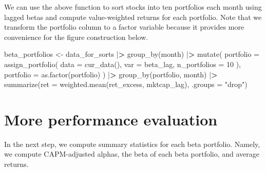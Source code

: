 \documentclass[
]{book}
\newenvironment{Shaded}{\begin{snugshade}}{\end{snugshade}}
\newcommand{\AttributeTok}[1]{\textcolor[rgb]{0.61,0.61,0.61}{#1}}
\newcommand{\DecValTok}[1]{\textcolor[rgb]{0.06,0.06,0.06}{#1}}
\newcommand{\ErrorTok}[1]{\textcolor[rgb]{0.14,0.14,0.14}{\textbf{#1}}}
\newcommand{\FunctionTok}[1]{\textcolor[rgb]{0,0,0}{#1}}
\newcommand{\NormalTok}[1]{#1}
\newcommand{\OtherTok}[1]{\textcolor[rgb]{0.37,0.37,0.37}{#1}}
\newcommand{\SpecialCharTok}[1]{\textcolor[rgb]{0,0,0}{#1}}
\newcommand{\StringTok}[1]{\textcolor[rgb]{0.5,0.5,0.5}{#1}}
\begin{document}
We can use the above function to sort stocks into ten portfolios each month using lagged betas and compute value-weighted returns for each portfolio.
Note that we transform the portfolio column to a factor variable because it provides more convenience for the figure construction below.

\begin{Shaded}
\begin{Highlighting}[]
\NormalTok{beta\_portfolios }\OtherTok{\textless{}{-}}\NormalTok{ data\_for\_sorts }\SpecialCharTok{|}\ErrorTok{\textgreater{}}
  \FunctionTok{group\_by}\NormalTok{(month) }\SpecialCharTok{|}\ErrorTok{\textgreater{}}
  \FunctionTok{mutate}\NormalTok{(}
    \AttributeTok{portfolio =} \FunctionTok{assign\_portfolio}\NormalTok{(}
      \AttributeTok{data =} \FunctionTok{cur\_data}\NormalTok{(),}
      \AttributeTok{var =}\NormalTok{ beta\_lag,}
      \AttributeTok{n\_portfolios =} \DecValTok{10}
\NormalTok{    ),}
    \AttributeTok{portfolio =} \FunctionTok{as.factor}\NormalTok{(portfolio)}
\NormalTok{  ) }\SpecialCharTok{|}\ErrorTok{\textgreater{}}
  \FunctionTok{group\_by}\NormalTok{(portfolio, month) }\SpecialCharTok{|}\ErrorTok{\textgreater{}}
  \FunctionTok{summarize}\NormalTok{(}\AttributeTok{ret =} \FunctionTok{weighted.mean}\NormalTok{(ret\_excess, mktcap\_lag), }\AttributeTok{.groups =} \StringTok{"drop"}\NormalTok{)}
\end{Highlighting}
\end{Shaded}

\hypertarget{more-performance-evaluation}{%
\section{More performance evaluation}\label{more-performance-evaluation}}

In the next step, we compute summary statistics for each beta portfolio. Namely, we compute CAPM-adjusted alphas, the beta of each beta portfolio, and average returns.

\begin{Shaded}
\end{Shaded}
\end{document}
